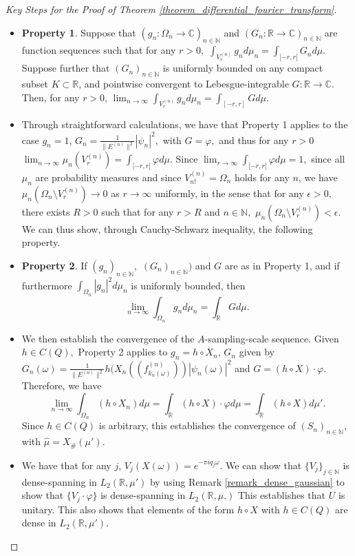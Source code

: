 \documentclass{amsart}
\theoremstyle{definition}
\theoremstyle{remark}
\def \HMU{\hat{\mu}}
\begin{document}
\begin{proof}[Key Steps for the Proof of Theorem \ref{theorem_differential_fourier_transform}]
\begin{itemize}
		\item \textbf{Property 1}. Suppose that $(g_n:\Omega_n\rightarrow\mathbb{C})_{n\in\mathbb{N}}$ and $(G_n:\mathbb{R}\rightarrow\mathbb{C})_{n\in\mathbb{N}}$ are function sequences such that for any $r>0,$ $\int_{V_r^{(n)}}g_nd\mu_n=\int_{[-r,r[} G_nd\mu.$ Suppose further that $(G_n)_{n\in\mathbb{N}}$ is uniformly bounded on any compact subset $K\subset\mathbb{R}$, and pointwise convergent to Lebesgue-integrable $G:\mathbb{R}\rightarrow\mathbb{C}.$ Then, for any $r>0$, $\lim_{n\rightarrow\infty}\int_{V_r^{(n)}}g_nd\mu_n=\int_{[-r,r]} Gd\mu.$
		\item Through straightforward calculations, we have that Property 1 applies to the case $g_n=1$, $G_n=\frac{1}{\|E^{(n)}\|^2}|\psi_n|^2,$ with $G=\varphi,$ and thus for any $r>0$ $\lim_{n\rightarrow\infty}\mu_n(V_r^{(n)})=\int_{[-r,r[}\varphi d\mu.$ Since $\lim_{r\rightarrow\infty}\int_{[-r,r[}\varphi d\mu=1,$ since all $\mu_n$ are probability measures and since $V_{n!}^{(n)}=\Omega_n$ holds for any $n$, we have $\mu_n(\Omega_n\setminus V_r^{(n)})\rightarrow 0$ as $r\rightarrow\infty$ uniformly, in the sense that for any $\epsilon>0,$ there exists $R>0$ such that for any $r>R$ and $n\in\mathbb{N},$  $\mu_n(\Omega_n\setminus V_r^{(n)})<\epsilon.$ We can thus show, through Cauchy-Schwarz inequality, the following property.
		\item \textbf{Property 2}. If $(g_n)_{n\in\mathbb{N}},$ $(G_n)_{n\in\mathbb{N}})$ and $G$ are as in Property 1, and if furthermore $\int_{\Omega_n}|g_n|^2d\mu_n$ is uniformly bounded, then $$\lim_{n\rightarrow\infty} \int_{\Omega_n} g_nd\mu_n=\int_{\mathbb{R}} Gd\mu.$$ 
		\item We then establish the convergence of the $A$-sampling-scale sequence. Given $h\in C(Q),$ Property 2 applies to $g_n=h\circ X_n$, $G_n$ given by $G_n(\omega)=\frac{1}{\|E^{(n)}\|^2}h(X_n((f_{k_n(\omega)}^{(n)}))|\psi_n(\omega)|^2$ and $G=(h\circ X)\cdot \varphi.$ Therefore, we have $$\lim_{n\rightarrow\infty}\int_{\Omega_n}(h\circ X_n)d\mu=\int_{\mathbb{R}} (h\circ X)\cdot\varphi d\mu=\int_{\mathbb{R}} (h\circ X)d\mu'.$$ Since  $h\in C(Q)$ is arbitrary, this establishes the convergence of $(S_n)_{n\in\mathbb{N}},$ with $\HMU=X_{\#}(\mu').$ 
		\item We have that for any $j$, $V_j(X(\omega))=e^{-\pi i q_j \omega}$. We can show that $\{V_j\}_{j\in\mathbb{N}}$ is dense-spanning in $L_2(\mathbb{R},\mu')$ by using Remark \ref{remark_dense_gaussian} to show that $\{V_j\cdot\varphi\}$ is dense-spanning in $L_2(\mathbb{R},\mu.)$ This establishes that $U$ is unitary. This also shows that elements of the form $h\circ X$ with $h\in C(Q)$ are dense in $L_2(\mathbb{R},\mu').$

\end{itemize}
\end{proof}
\end{document}
